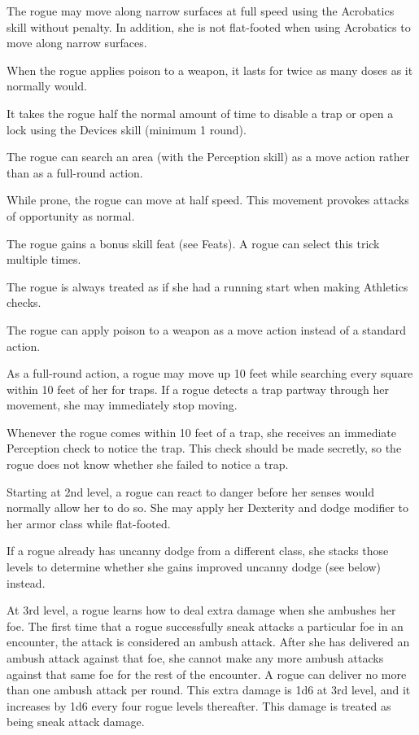  The rogue may move along narrow surfaces at full speed using the Acrobatics skill without penalty. In addition, she is not flat-footed when using Acrobatics to move along narrow surfaces.

 When the rogue applies poison to a weapon, it lasts for twice as many doses as it normally would.

 It takes the rogue half the normal amount of time to disable a trap or open a lock using the Devices skill (minimum 1 round).

 The rogue can search an area (with the Perception skill) as a move action rather than as a full-round action.

 While prone, the rogue can move at half speed. This movement provokes attacks of opportunity as normal.

 The rogue gains a bonus skill feat (see Feats). A rogue can select this trick multiple times.

 The rogue is always treated as if she had a running start when making Athletics checks.

 The rogue can apply poison to a weapon as a move action instead of a standard action.

 As a full-round action, a rogue may move up 10 feet while searching every square within 10 feet of her for traps. If a rogue detects a trap partway through her movement, she may immediately stop moving.

 Whenever the rogue comes within 10 feet of a trap, she receives an immediate Perception check to notice the trap. This check should be made secretly, so the rogue does not know whether she failed to notice a trap.

 Starting at 2nd level, a rogue can react to danger before her senses would normally allow her to do so. She may apply her Dexterity and dodge modifier to her armor class while flat-footed.

If a rogue already has uncanny dodge from a different class, she stacks those levels to determine whether she gains improved uncanny dodge (see below) instead.

 At 3rd level, a rogue learns how to deal extra damage when she ambushes her foe. The first time that a rogue successfully sneak attacks a particular foe in an encounter, the attack is considered an ambush attack. After she has delivered an ambush attack against that foe, she cannot make any more ambush attacks against that same foe for the rest of the encounter. A rogue can deliver no more than one ambush attack per round. This extra damage is 1d6 at 3rd level, and it increases by 1d6 every four rogue levels thereafter. This damage is treated as being sneak attack damage.

